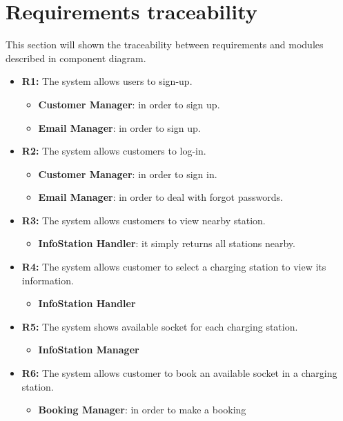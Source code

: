 \section{Requirements traceability}
This section will shown the traceability between requirements and modules described in component diagram.

\begin{itemize}
    \item \textbf{R1:} The system allows users to sign-up.
          \begin{itemize}
              \item \textbf{Customer Manager}: in order to sign up.
              \item \textbf{Email Manager}:  in order to sign up.  
          \end{itemize}
    \item \textbf{R2:} The system allows customers to log-in.
          \begin{itemize}
              \item \textbf{Customer Manager}:  in order to sign in.   
              \item \textbf{Email Manager}:  in order to deal with forgot passwords.             
          \end{itemize}
    \item \textbf{R3:} The system allows customers to view nearby station.
          \begin{itemize}
              \item \textbf{InfoStation Handler}: it simply returns all stations nearby.
          \end{itemize}

    \item \textbf{R4:} The system allows customer to select a charging station to view its information.
          \begin{itemize}
              \item \textbf{InfoStation Handler}
          \end{itemize}

    \item \textbf{R5:} The system shows available socket for each charging station.
          \begin{itemize}
              \item \textbf{InfoStation Manager}
          \end{itemize}
    \item \textbf{R6:} The system allows customer to book an available socket in a charging station.
          \begin{itemize}
              \item \textbf{Booking Manager}: in order to make a booking
              

\end{itemize}
\end{itemize}
